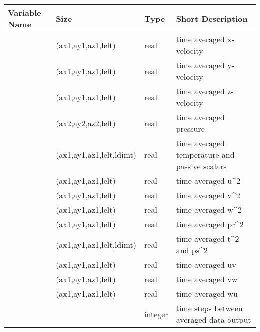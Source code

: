 \documentclass[letterpaper,10pt,english]{sphinxmanual}
\begin{document}
\begin{savenotes}\sphinxattablestart
\centering
\begin{tabulary}{\linewidth}[t]{|T|T|T|T|}
\hline
\sphinxstyletheadfamily 
Variable Name
&\sphinxstyletheadfamily 
Size
&\sphinxstyletheadfamily 
Type
&\sphinxstyletheadfamily 
Short Description
\\
\hline
{}
&
(ax1,ay1,az1,lelt)
&
real
&
time averaged x-velocity
\\
\hline
{}
&
(ax1,ay1,az1,lelt)
&
real
&
time averaged y-velocity
\\
\hline
{}
&
(ax1,ay1,az1,lelt)
&
real
&
time averaged z-velocity
\\
\hline
{}
&
(ax2,ay2,az2,lelt)
&
real
&
time averaged pressure
\\
\hline
{}
&
(ax1,ay1,az1,lelt,ldimt)
&
real
&
time averaged temperature and passive scalars
\\
\hline
{}
&
(ax1,ay1,az1,lelt)
&
real
&
time averaged u\textasciicircum{}2
\\
\hline
{}
&
(ax1,ay1,az1,lelt)
&
real
&
time averaged v\textasciicircum{}2
\\
\hline
{}
&
(ax1,ay1,az1,lelt)
&
real
&
time averaged w\textasciicircum{}2
\\
\hline
{}
&
(ax1,ay1,az1,lelt)
&
real
&
time averaged pr\textasciicircum{}2
\\
\hline
{}
&
(ax1,ay1,az1,lelt,ldimt)
&
real
&
time averaged t\textasciicircum{}2 and ps\textasciicircum{}2
\\
\hline
{}
&
(ax1,ay1,az1,lelt)
&
real
&
time averaged uv
\\
\hline
{}
&
(ax1,ay1,az1,lelt)
&
real
&
time averaged vw
\\
\hline
{}
&
(ax1,ay1,az1,lelt)
&
real
&
time averaged wu
\\
\hline
{}
&
\textendash{}
&
integer
&
time steps between averaged data output
\\
\hline
\end{tabulary}
\par
\sphinxattableend\end{savenotes}
\end{document}
